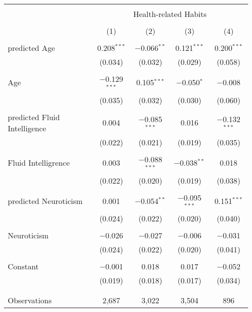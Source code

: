 
\begin{table}[!htbp] \centering 
  \caption{} 
  \label{} 
\begin{tabular}{@{\extracolsep{5pt}}lcccc} 
\\[-1.8ex]\hline 
\hline \\[-1.8ex] 
 & \multicolumn{4}{c}{Health-related Habits} \\ 
\cline{2-5} 
\\[-1.8ex] & (1) & (2) & (3) & (4)\\ 
\hline \\[-1.8ex] 
 predicted Age & 0.208$^{***}$ & $-$0.066$^{**}$ & 0.121$^{***}$ & 0.200$^{***}$ \\ 
  & (0.034) & (0.032) & (0.029) & (0.058) \\ 
  & & & & \\ 
 Age & $-$0.129$^{***}$ & 0.105$^{***}$ & $-$0.050$^{*}$ & $-$0.008 \\ 
  & (0.035) & (0.032) & (0.030) & (0.060) \\ 
  & & & & \\ 
 predicted Fluid Intelligence & 0.004 & $-$0.085$^{***}$ & 0.016 & $-$0.132$^{***}$ \\ 
  & (0.022) & (0.021) & (0.019) & (0.035) \\ 
  & & & & \\ 
 Fluid Intelligrence & 0.003 & $-$0.088$^{***}$ & $-$0.038$^{**}$ & 0.018 \\ 
  & (0.022) & (0.020) & (0.019) & (0.038) \\ 
  & & & & \\ 
 predicted Neuroticism & 0.001 & $-$0.054$^{**}$ & $-$0.095$^{***}$ & 0.151$^{***}$ \\ 
  & (0.024) & (0.022) & (0.020) & (0.040) \\ 
  & & & & \\ 
 Neuroticism & $-$0.026 & $-$0.027 & $-$0.006 & $-$0.031 \\ 
  & (0.024) & (0.022) & (0.020) & (0.041) \\ 
  & & & & \\ 
 Constant & $-$0.001 & 0.018 & 0.017 & $-$0.052 \\ 
  & (0.019) & (0.018) & (0.017) & (0.034) \\ 
  & & & & \\ 
\hline \\[-1.8ex] 
Observations & 2,687 & 3,022 & 3,504 & 896 \\ 

\end{tabular}
\end{table}
